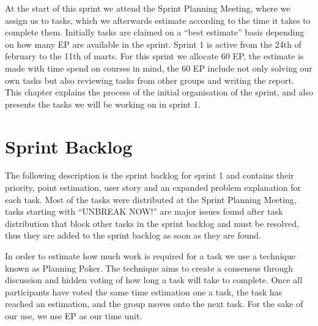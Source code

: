 At the start of this sprint we attend the Sprint Planning Meeting, where we assign us to tasks, which we afterwards estimate according to the time it takes to complete them.
Initially tasks are claimed on a ``best estimate'' basis depending on how many EP are available in the sprint.
Sprint 1 is active from the 24th of february to the 11th of marts. 
For this sprint we allocate 60 EP, the estimate is made with time spend on courses in mind, the 60 EP include not only solving our own tasks but also reviewing tasks from other groups and writing the report.
This chapter explains the process of the initial organisation of the sprint, and also presents the tasks we will be working on in sprint 1.

\section{Sprint Backlog}\label{plan1}
The following description is the sprint backlog for sprint 1 and contains their priority, point estimation, user story and an expanded problem explanation for each task.
Most of the tasks were distributed at the Sprint Planning Meeting, tasks starting with ``UNBREAK NOW!'' are major issues found after task distribution that block other tasks in the sprint backlog and must be resolved, thus they are added to the sprint backlog as soon as they are found.

In order to estimate how much work is required for a task we use a technique known as Planning Poker.
The technique aims to create a consensus through discussion and hidden voting of how long a task will take to complete.
Once all participants have voted the same time estimation one a task, the task has reached an estimation, and the group moves onto the next task.
For the sake of our use, we use EP as our time unit.

